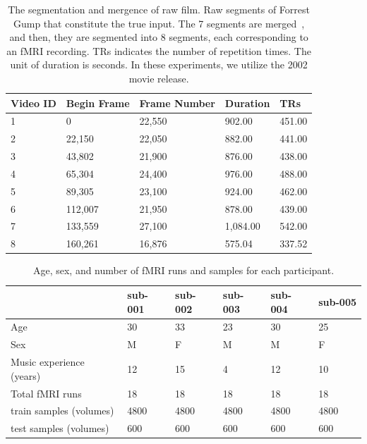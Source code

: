 \documentclass[journal]{IEEEtran}
\begin{document}
\begin{table}[h]
	\centering
	\footnotesize
	\caption{The segmentation and mergence of raw film.
		Raw segments of Forrest Gump that constitute the true input. 
		The 7 segments are merged~\cite{2014A}, and then, they are segmented into 8 segments, each corresponding to an fMRI recording. 
		TRs indicates the number of repetition times.
		The unit of duration is seconds.
		In these experiments, we utilize the 2002 movie release.}
	
	\label{tab:movie_seg}
	
	\begin{tabular}{p{0.9cm}<{\centering}p{1.2cm}<{\centering}p{1.45cm}<{\centering}p{1.15cm}<{\centering}p{0.95cm}<{\centering}}
		\toprule[1.5pt]
		{Video ID} & {Begin Frame} & {Frame Number} & {Duration}  & {TRs}   \\ \midrule[1pt]
		1       & 0           & 22,550      & 902.00 & 451.00 \\ 
		2       & 22,150      & 22,050      & 882.00 & 441.00 \\ 
		3       & 43,802      & 21,900      & 876.00 & 438.00 \\ 
		4       & 65,304      & 24,400     & 976.00 & 488.00 \\ 
		5       & 89,305     & 23,100     & 924.00 & 462.00 \\ 
		6       & 112,007     & 21,950     & 878.00 & 439.00 \\ 
		7       & 133,559     & 27,100     & 1,084.00 & 542.00 \\
		8       & 160,261     & 16,876     & 575.04 & 337.52 \\ 
		\bottomrule[1.5pt]
	\end{tabular}
	
\end{table}


\begin{table}[h]
	\centering
	\footnotesize
	\caption{Age, sex, and number of fMRI runs and samples for each participant.}
	
	\label{tab:fMRI_runs}
	
	\begin{tabular}{p{2.9cm}<{\centering}p{0.6cm}<{\centering}p{0.6cm}<{\centering}p{0.7cm}<{\centering}p{0.7cm}<{\centering}p{0.7cm}<{\centering}}
		\toprule[1.5pt]
		 & sub-001  & sub-002    & sub-003  & sub-004 & sub-005  \\ \midrule[1pt]
		Age     		  & 30 			   & 33 	   & 23  & 30  & 25		  \\
		Sex     		  & M  & F 	   & M  & M  & F		  \\
		Music experience (years)     		  & 12  & 15 	   & 4  & 12  & 10		  \\
		Total fMRI runs     		  & 18  & 18 	   & 18  & 18  & 18		  \\
		train samples (volumes) & 4800  & 4800 	   & 4800  & 4800  & 4800		  \\
		test samples (volumes) & 600  & 600 	   & 600  & 600  & 600		  \\
		\bottomrule[1.5pt]
	\end{tabular}
	
\end{table}
\end{document}
